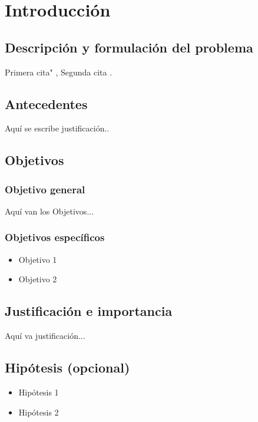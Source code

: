 \documentclass[12pt]{report}
\begin{document}


\chapter{Introducción}
 


\section{Descripción y formulación del problema}
Primera cita"  \cite{2020arXiv200711053A}, Segunda cita \cite{2021arXiv210401765A}.


\section{Antecedentes}
Aquí se escribe justificación..
\section{Objetivos}
\subsection{Objetivo general}
Aquí van los Objetivos...
\subsection{Objetivos específicos}
\begin{itemize}
\item Objetivo 1
\item Objetivo 2
\end{itemize}

\section{Justificación e importancia}
Aquí va justificación...

\section{Hipótesis (opcional)} 
\begin{itemize}
\item Hipótesis 1
\item Hipótesis 2
\end{itemize}
\end{document}

